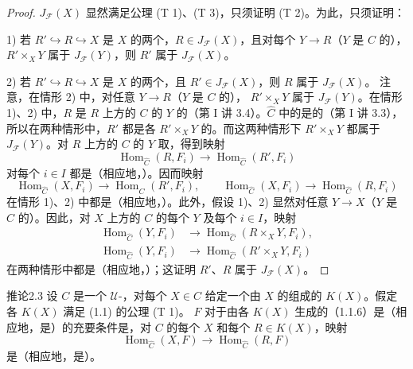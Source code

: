 \begin{proof}
$J_{\mathscr F}(X)$ 显然满足公理 (T 1)、(T 3)，只须证明 (T 2)。为此，只须证明：
\par 1) 若 $R'\hookrightarrow R\hookrightarrow X$ 是 $X$ 的两个，$R\in J_{\mathscr F}(X)$，且对每个 $Y\to R$（$Y$ 是 $C$ 的）， $R'\times_XY$ 属于 $J_{\mathscr F}(Y)$，则 $R'$ 属于 $J_{\mathscr F}(X)$。
\par 2) 若 $R'\hookrightarrow R\hookrightarrow X$ 是 $X$ 的两个，且 $R'\in J_{\mathscr F}(X)$，则 $R$ 属于 $J_{\mathscr F}(X)$。
注意，在情形 2) 中，对任意 $Y\to R$（$Y$ 是 $C$ 的）， $R'\times_XY$ 属于 $J_{\mathscr F}(Y)$。在情形 1)、2) 中，$R$ 是 $R$ 上方的 $C$ 的 $Y$ 的（第 I 讲 3.4）。$\widehat C$ 中的是的（第 I 讲 3.3），所以在两种情形中，$R'$ 都是各 $R'\times_XY$ 的。而这两种情形下 $R'\times_XY$ 都属于 $J_{\mathscr F}(Y)$。对 $R$ 上方的 $C$ 的 $Y$ 取，得到映射
\[\operatorname{Hom}_{\widehat C}(R,F_i)\longrightarrow\operatorname{Hom}_{\widehat C}(R',F_i)\]
对每个 $i\in I$ 都是（相应地，）。因而映射
\[\operatorname{Hom}_{\widehat C}(X,F_i)\longrightarrow\operatorname{Hom}_{\widehat C}(R',F_i),\qquad
\operatorname{Hom}_{\widehat C}(X,F_i)\longrightarrow\operatorname{Hom}_{\widehat C}(R,F_i)\]
在情形 1)、2) 中都是（相应地，）。此外，假设 1)、2) 显然对任意 $Y\to X$（$Y$ 是 $C$ 的）。因此，对 $X$ 上方的 $C$ 的每个 $Y$ 及每个 $i\in I$，映射
\[\begin{split}
\operatorname{Hom}_{\widehat C}(Y,F_i)&\longrightarrow\operatorname{Hom}_{\widehat C}(R\times_XY,F_i),\\
\operatorname{Hom}_{\widehat C}(Y,F_i)&\longrightarrow\operatorname{Hom}_{\widehat C}(R'\times_XY,F_i)
\end{split}\]
在两种情形中都是（相应地，）；这证明 $R'$、$R$ 属于 $J_{\mathscr F}(X)$。
\end{proof}
\begin{SGAresult}{推论}{2.3}
设 $C$ 是一个 $\mathcal U$-，对每个 $X\in C$ 给定一个由 $X$ 的组成的 $K(X)$。假定各 $K(X)$ 满足 (1.1) 的公理 (T 1)。 $F$ 对于由各 $K(X)$ 生成的（1.1.6）是（相应地，是）的充要条件是，对 $C$ 的每个 $X$ 和每个 $R\in K(X)$，映射
\[\operatorname{Hom}_{\widehat C}(X,F)\longrightarrow\operatorname{Hom}_{\widehat C}(R,F)\]
是（相应地，是）。
\end{SGAresult}
